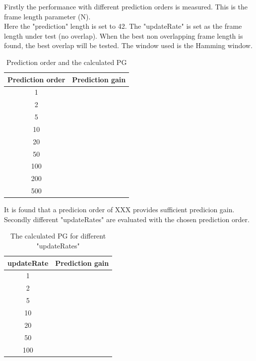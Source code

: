 Firstly the performance with different prediction orders is measured. This is the frame length parameter (N). \\ 
Here the "prediction" length is set to 42. The "updateRate" is set as the frame length under test (no overlap). When the best non overlapping frame length is found, the best overlap will be tested. The window used is the Hamming window.   
\begin{table}[H]
	\centering
	\begin{tabular}{c c} \toprule
		Prediction order 	& Prediction gain 	\\ \bottomrule
		1					& 					\\
		2					&					\\
		5					&					\\
		10					&					\\
		20					&					\\
		50					&					\\
		100					&					\\
		200					&					\\
		500					&					\\ \bottomrule
	\end{tabular}
\label{Tab:PredictionOrderGain}
\caption{Prediction order and the calculated PG}
\end{table}
It is found that a predicion order of XXX provides sufficient predicion gain. \\

Secondly different "updateRates" are evaluated with the chosen prediction order. 
\begin{table}[H]
	\centering
	\begin{tabular}{c c} \toprule
		updateRate		 	& Prediction gain 	\\ \bottomrule
		1					& 					\\
		2					&					\\
		5					&					\\
		10					&					\\
		20					&					\\
		50					&					\\
		100					&					\\ \bottomrule
	\end{tabular}
	\label{Tab:PredUpdateRateGain}
	\caption{The calculated PG for different "updateRates"}
\end{table}



